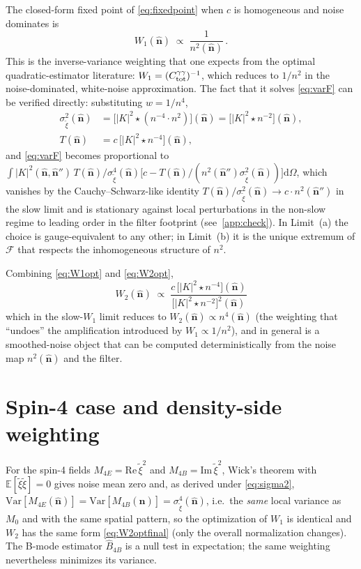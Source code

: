 \documentclass[11pt]{article}
\newcommand{\nv}{\hat{\boldsymbol{n}}}
\newcommand{\dom}{\mathrm{d}\Omega}
\newcommand{\E}{\mathbb{E}}
\newcommand{\Var}{\mathrm{Var}}
\newcommand{\Wone}{W_1}
\newcommand{\Wtwo}{W_2}
\begin{document}
The closed-form fixed point of \cref{eq:fixedpoint} when $c$ is homogeneous
and noise dominates is
\begin{equation}
\boxed{\;\Wone(\nv)\;\propto\;\frac{1}{n^2(\nv)}\,.\;}
\label{eq:W1opt}
\end{equation}
This is the inverse-variance weighting that one expects from the optimal
quadratic-estimator literature: $\Wone=(C^{\gamma\gamma}_{\rm tot})^{-1}$,
which reduces to $1/n^2$ in the noise-dominated, white-noise approximation.
The fact that it solves \cref{eq:varF} can be verified directly:
substituting $w=1/n^4$,
\begin{align}
\sigma^2_{\tilde\xi}(\nv)&=\bigl[|K|^2\star(n^{-4}\cdot n^2)\bigr](\nv)
=\bigl[|K|^2\star n^{-2}\bigr](\nv),\\
T(\nv)&=c\,\bigl[|K|^2\star n^{-4}\bigr](\nv),
\end{align}
and \cref{eq:varF} becomes proportional to
$\int|K|^2(\nv,\nv'')\,T(\nv)/\sigma^4_{\tilde\xi}(\nv)\bigl[c
-T(\nv)/(n^2(\nv'')\sigma^2_{\tilde\xi}(\nv))\bigr]\dom$, which vanishes by
the Cauchy--Schwarz-like identity $T(\nv)/\sigma^2_{\tilde\xi}(\nv)\to c\cdot
n^2(\nv'')$ in the slow limit and is stationary against local perturbations
in the non-slow regime to leading order in the filter footprint
(see~\cref{app:check}). In Limit~(a) the choice is gauge-equivalent to any
other; in Limit~(b) it is the unique extremum of $\mathcal F$ that respects
the inhomogeneous structure of $n^2$.

Combining \cref{eq:W1opt} and \cref{eq:W2opt},
\begin{equation}
\boxed{\;\Wtwo(\nv)\;\propto\;
\frac{c\,\bigl[|K|^2\star n^{-4}\bigr](\nv)}{\bigl[|K|^2\star n^{-2}\bigr]^2(\nv)}\;}
\label{eq:W2optfinal}
\end{equation}
which in the slow-$\Wone$ limit reduces to $\Wtwo(\nv)\propto n^4(\nv)$ (the
weighting that ``undoes'' the amplification introduced by $\Wone\propto
1/n^2$), and in general is a smoothed-noise object that can be computed
deterministically from the noise map $n^2(\nv)$ and the filter.

\section{Spin-4 case and density-side weighting}

For the spin-4 fields $M_{4E}=\mathrm{Re}\,\tilde\xi^2$ and
$M_{4B}=\mathrm{Im}\,\tilde\xi^2$, Wick's theorem with
$\E[\tilde\xi\tilde\xi]=0$ gives noise mean zero and, as derived under
\cref{eq:sigma2},
$\Var[M_{4E}(\nv)]=\Var[M_{4B}(\nv)]=\sigma^4_{\tilde\xi}(\nv)$,
i.e.\ the \emph{same} local variance as $M_0$ and with the same spatial
pattern, so the optimization of $\Wone$ is identical and $\Wtwo$ has the same
form \cref{eq:W2optfinal} (only the overall normalization changes). The B-mode
estimator $\hat B_{4B}$ is a null test in expectation; the same weighting
nevertheless minimizes its variance.
\end{document}
